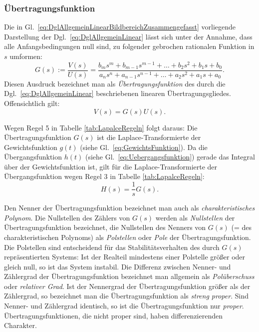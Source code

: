 \subsubsection{Übertragungsfunktion}\label{sec:gewichts-ubertr-und}
Die in Gl.~\eqref{eq:DglAllgemeinLinearBildbereichZusammengefasst} vorliegende Darstellung der Dgl.~\eqref{eq:DglAllgemeinLinear} lässt sich unter der Annahme, dass alle Anfangsbedingungen null sind, zu folgender gebrochen rationalen Funktion in $s$ umformen:
\begin{equation} \label{eq:UebertragungsfunktionAllgemein}
  G(s) := \frac{V(s)}{U(s)} = \frac{b_m s^{m} + b_{m-1} s^{m-1} + \ldots + b_2 s^2 + b_1 s + b_0}{a_n s^n + a_{n-1}s^{n-1} + \ldots + a_2 s^2 + a_1 s + a_0}.
\end{equation}
Diesen Ausdruck bezeichnet man als \emph{Übertragungsfunktion} des durch die Dgl.~\eqref{eq:DglAllgemeinLinear} beschriebenen linearen Übertragungsgliedes.
Offensichtlich gilt:
\begin{equation*}
  V(s) = G(s) U(s).
\end{equation*}
\begin{RstWichtigBox}
  Wegen Regel 5 in Tabelle \ref{tab:LapalceRegeln} folgt daraus: Die Übertragungsfunktion $G(s)$ ist die Laplace-Transformierte der Gewichtsfunktion $g(t)$ (siehe Gl.~\eqref{eq:GewichtsFunktion}).
  Da die Übergangsfunktion  $h(t)$ (siehe Gl.~\eqref{eq:Uebergangsfunktion}) gerade das Integral über der Gewichtsfunktion ist, gilt für die Laplace-Transformierte der Übergangsfunktion wegen Regel 3 in Tabelle \ref{tab:LapalceRegeln}:
  \begin{equation*}
    H(s) = \frac{1}{s}G(s).
  \end{equation*}
\end{RstWichtigBox}

  Den Nenner der Übertragungsfunktion bezeichnet man auch als \emph{charakteristisches Polynom}. Die Nullstellen des Zählers von $G(s)$ werden als \emph{Nullstellen} der Übertragungsfunktion bezeichnet, die Nullstellen des Nenners von $G(s)$ (= des charakteristischen Polynoms) als \emph{Polstellen} oder \emph{Pole} der Übertragungsfunktion.
  Die Polstellen sind entscheidend für das Stabilitätsverhalten des durch $G(s)$ repräsentierten Systems: Ist der Realteil mindestens einer Polstelle größer oder gleich null, so ist das System instabil.
  Die Differenz zwischen Nenner- und Zählergrad der Übertragungsfunktion bezeichnet man allgemein als \emph{Polüberschuss} oder \emph{relativer Grad}.
  Ist der Nennergrad der Übertragungsfunktion größer als der Zählergrad, so bezeichnet man die Übertragungsfunktion als \emph{streng proper}. Sind Nenner- und Zählergrad identisch, so ist die Übertragungsfunktion nur \emph{proper}.
  Übertragungsfunktionen, die nicht proper sind, haben differenzierenden Charakter.

